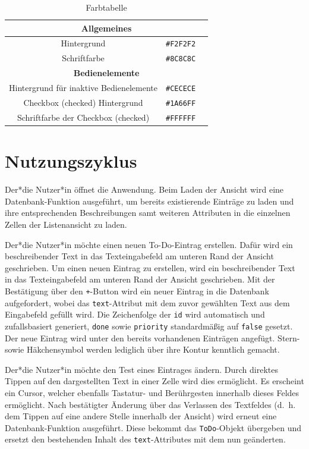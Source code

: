 \begin{itemize}
\begin{table}[h!]
\begin{tabular}{ |c|c|c|}
		
		\hline
		\multicolumn{3}{|c|}{\textbf{Allgemeines}}\\
		\hline
		Hintergrund & \texttt{\#F2F2F2} &\cellcolor[HTML]{F2F2F2}\\
		\hline
		Schriftfarbe & \texttt{\#8C8C8C} &\cellcolor[HTML]{8C8C8C}\\
		\hline
		
		
		\hline
		\multicolumn{3}{|c|}{\textbf{Bedienelemente}}\\
		\hline
		Hintergrund für inaktive Bedienelemente & \texttt{\#CECECE} &\cellcolor[HTML]{CECECE}\\
		\hline
		Checkbox (checked) Hintergrund & \texttt{\#1A66FF} &\cellcolor[HTML]{1A66FF}\\
		\hline
		Schriftfarbe der Checkbox (checked) & \texttt{\#FFFFFF} &\cellcolor[HTML]{FFFFFF}\\
		\hline
	\end{tabular}
	\caption{Farbtabelle} \label{tab:farbtabelle}
\end{table}


\section{Nutzungszyklus}
Der*die Nutzer*in öffnet die Anwendung. Beim Laden der Ansicht wird eine Datenbank-Funktion ausgeführt, um bereits existierende Einträge zu laden und ihre entsprechenden Beschreibungen samt weiteren Attributen in die einzelnen Zellen der Listenansicht zu laden. 

Der*die Nutzer*in möchte einen neuen To-Do-Eintrag erstellen. Dafür wird ein beschreibender Text in das Texteingabefeld am unteren Rand der Ansicht geschrieben. Um einen neuen Eintrag zu erstellen, wird ein beschreibender Text in das Texteingabefeld am unteren Rand der Ansicht geschrieben. Mit der Bestätigung über den \texttt{+}-Button wird ein neuer Eintrag in die Datenbank aufgefordert, wobei das \texttt{text}-Attribut mit dem zuvor gewählten Text aus dem Eingabefeld gefüllt wird. Die Zeichenfolge der \texttt{id} wird automatisch und zufallsbasiert generiert, \texttt{done} sowie \texttt{priority} standardmäßig auf \texttt{false} gesetzt. Der neue Eintrag wird unter den bereits vorhandenen Einträgen angefügt. Stern- sowie Häkchensymbol werden lediglich über ihre Kontur kenntlich gemacht.

Der*die Nutzer*in möchte den Test eines Eintrages ändern. Durch direktes Tippen auf den dargestellten Text in einer Zelle wird dies ermöglicht. Es erscheint ein Cursor, welcher ebenfalls Tastatur- und Berührgesten innerhalb dieses Feldes ermöglicht. Nach bestätigter Änderung über das Verlassen des Textfeldes (d.\ h. dem Tippen auf eine andere Stelle innerhalb der Ansicht) wird erneut eine Datenbank-Funktion ausgeführt. Diese bekommt das \texttt{ToDo}-Objekt übergeben und ersetzt den bestehenden Inhalt des \texttt{text}-Attributes mit dem nun geänderten.


\end{itemize}
